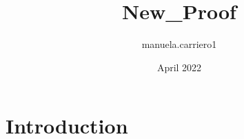\documentclass{article}
\title{New_Proof}
\author{manuela.carriero1 }
\date{April 2022}
\begin{document}
\maketitle

\section{Introduction}
\end{document}
